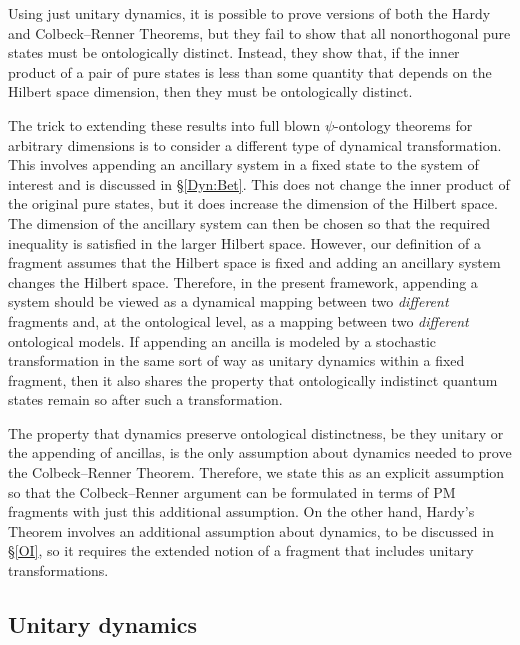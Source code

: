 \documentclass[DIV=calc,fontsize=12pt]{scrartcl} %
\theoremstyle{definition}
\theoremstyle{plain}
\begin{document}
Using just unitary dynamics, it is possible to prove versions of both
the Hardy and Colbeck--Renner Theorems, but they fail to show that all
nonorthogonal pure states must be ontologically distinct.  Instead,
they show that, if the inner product of a pair of pure states is less
than some quantity that depends on the Hilbert space dimension, then
they must be ontologically distinct.

The trick to extending these results into full blown $\psi$-ontology
theorems for arbitrary dimensions is to consider a different type of
dynamical transformation.  This involves appending an ancillary system
in a fixed state to the system of interest and is discussed in
\S\ref{Dyn:Bet}.  This does not change the inner product of the
original pure states, but it does increase the dimension of the
Hilbert space.  The dimension of the ancillary system can then be
chosen so that the required inequality is satisfied in the larger
Hilbert space.  However, our definition of a fragment assumes that the
Hilbert space is fixed and adding an ancillary system changes the
Hilbert space.  Therefore, in the present framework, appending a
system should be viewed as a dynamical mapping between two
\emph{different} fragments and, at the ontological level, as a mapping
between two \emph{different} ontological models.  If appending an
ancilla is modeled by a stochastic transformation in the same sort of
way as unitary dynamics within a fixed fragment, then it also shares
the property that ontologically indistinct quantum states remain so
after such a transformation.

The property that dynamics preserve ontological distinctness, be
they unitary or the appending of ancillas, is the only assumption
about dynamics needed to prove the Colbeck--Renner Theorem.  Therefore,
we state this as an explicit assumption so that the Colbeck--Renner
argument can be formulated in terms of PM fragments with just this
additional assumption.  On the other hand, Hardy's Theorem involves an
additional assumption about dynamics, to be discussed in \S\ref{OI},
so it requires the extended notion of a fragment that includes unitary
transformations.

\subsection{Unitary dynamics}

\label{Dyn:With}
\end{document}
